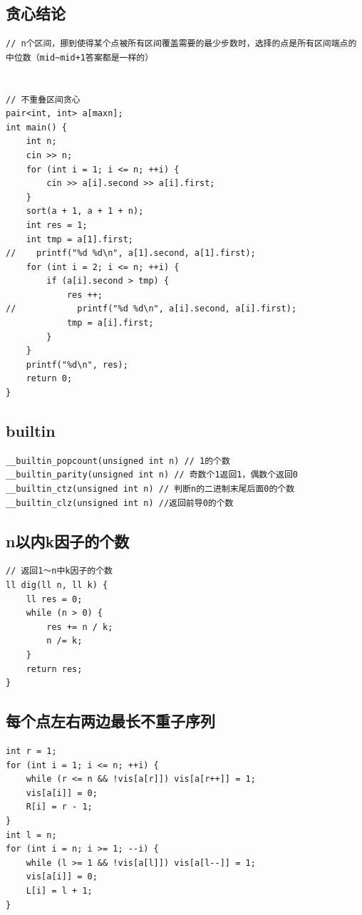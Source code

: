 \documentclass[twoside]{article}
\begin{document}
\subsection{贪心结论}
\begin{lstlisting}
// n个区间，挪到使得某个点被所有区间覆盖需要的最少步数时，选择的点是所有区间端点的中位数（mid~mid+1答案都是一样的）


// 不重叠区间贪心
pair<int, int> a[maxn];
int main() {
    int n;
    cin >> n;
    for (int i = 1; i <= n; ++i) {
        cin >> a[i].second >> a[i].first;
    }
    sort(a + 1, a + 1 + n);
    int res = 1;
    int tmp = a[1].first;
//    printf("%d %d\n", a[1].second, a[1].first);
    for (int i = 2; i <= n; ++i) {
        if (a[i].second > tmp) {
            res ++;
//            printf("%d %d\n", a[i].second, a[i].first);
            tmp = a[i].first;
        }
    }
    printf("%d\n", res);
    return 0;
}
\end{lstlisting}
\subsection{builtin}
\begin{lstlisting}
__builtin_popcount(unsigned int n) // 1的个数
__builtin_parity(unsigned int n) // 奇数个1返回1，偶数个返回0
__builtin_ctz(unsigned int n) // 判断n的二进制末尾后面0的个数
__builtin_clz(unsigned int n) //返回前导0的个数
\end{lstlisting}
\subsection{n以内k因子的个数}
\begin{lstlisting}
// 返回1～n中k因子的个数
ll dig(ll n, ll k) {
    ll res = 0;
    while (n > 0) {
        res += n / k;
        n /= k;
    }
    return res;
}
\end{lstlisting}
\subsection{每个点左右两边最长不重子序列}
\begin{lstlisting}
int r = 1;
for (int i = 1; i <= n; ++i) {
    while (r <= n && !vis[a[r]]) vis[a[r++]] = 1;
    vis[a[i]] = 0;
    R[i] = r - 1;
}
int l = n;
for (int i = n; i >= 1; --i) {
    while (l >= 1 && !vis[a[l]]) vis[a[l--]] = 1;
    vis[a[i]] = 0;
    L[i] = l + 1;
}\end{lstlisting}
\end{document}
